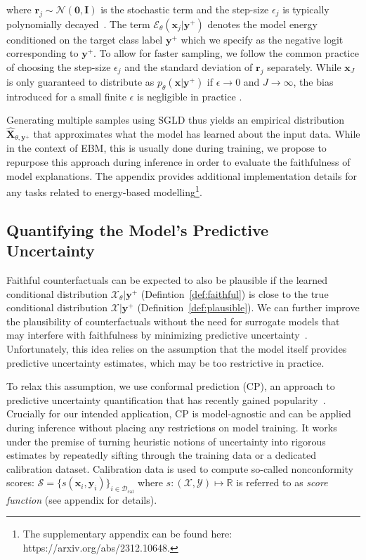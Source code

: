 \documentclass[letterpaper]{article} %
\begin{document}
where $\mathbf{r}_j \sim \mathcal{N}(\mathbf{0},\mathbf{I})$ is the stochastic term and the step-size $\epsilon_j$ is typically polynomially decayed~\citep{welling2011bayesian}. The term $\mathcal{E}_{\theta}(\mathbf{x}_j|\mathbf{y}^+)$ denotes the model energy conditioned on the target class label $\mathbf{y}^+$ which we specify as the negative logit corresponding to $\mathbf{y}^{+}$. To allow for faster sampling, we follow the common practice of choosing the step-size $\epsilon_j$ and the standard deviation of $\mathbf{r}_j$ separately. While $\mathbf{x}_J$ is only guaranteed to distribute as $p_{\theta}(\mathbf{x}|\mathbf{y}^{+})$ if $\epsilon \rightarrow 0$ and $J \rightarrow \infty$, the bias introduced for a small finite $\epsilon$ is negligible in practice \citep{murphy2023probabilistic}. 

Generating multiple samples using SGLD thus yields an empirical distribution $\widehat{\mathbf{X}}_{\theta,\mathbf{y}^+}$ that approximates what the model has learned about the input data. While in the context of EBM, this is usually done during training, we propose to repurpose this approach during inference in order to evaluate the faithfulness of model explanations. The appendix provides additional implementation details for any tasks related to energy-based modelling\footnote{The supplementary appendix can be found here: https://arxiv.org/abs/2312.10648.}. 

\subsection{Quantifying the Model's Predictive Uncertainty}

Faithful counterfactuals can be expected to also be plausible if the learned conditional distribution $\mathcal{X}_{\theta}|\mathbf{y}^+$ (Defintion~\ref{def:faithful}) is close to the true conditional distribution $\mathcal{X}|\mathbf{y}^+$ (Definition~\ref{def:plausible}). We can further improve the plausibility of counterfactuals without the need for surrogate models that may interfere with faithfulness by minimizing predictive uncertainty~\citep{schut2021generating}.
Unfortunately, this idea relies on the assumption that the model itself provides predictive uncertainty estimates, which may be too restrictive in practice. 

To relax this assumption, we use conformal prediction (CP), an approach to predictive uncertainty quantification that has recently gained popularity~\citep{angelopoulos2021gentle,manokhin2022awesome}. Crucially for our intended application, CP is model-agnostic and can be applied during inference without placing any restrictions on model training. It works under the premise of turning heuristic notions of uncertainty into rigorous estimates by repeatedly sifting through the training data or a dedicated calibration dataset. Calibration data is used to compute so-called nonconformity scores: $\mathcal{S}=\{s(\mathbf{x}_i,\mathbf{y}_i)\}_{i \in \mathcal{D}_{\text{cal}}}$ where $s: (\mathcal{X},\mathcal{Y}) \mapsto \mathbb{R}$ is referred to as \textit{score function} (see appendix for details).
\end{document}

